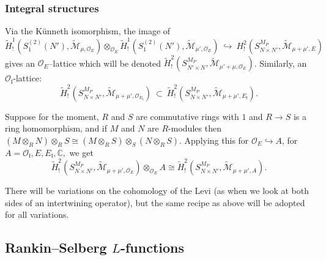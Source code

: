 \documentclass[11pt]{amsart}
\newcommand{\cO}{\mathcal O}
\newcommand{\fl}{\mathfrak l}
\begin{document}
\subsubsection{Integral structures}
\label{sec:integral-kunneth-levi}
Via the K\"unneth isomorphism, the image of 
 $$
 \tilde{H}^1_!(S_1^{(2)}(N'), \widetilde{\mathcal{M}}_{\mu, \mathcal{O}_E}) 
 \otimes_{\mathcal{O}_E} 
 \tilde{H}^1_!(S_1^{(2)}(N'), \widetilde{\mathcal{M}}_{\mu', \mathcal{O}_E}) \ \hookrightarrow \ 
 H^2_{!}(S^{M_P}_{N \times N'}, \widetilde{\mathcal{M}}_{\mu +\mu', E})
 $$ 
gives an $\mathcal{O}_E$--lattice 
which will be denoted $\tilde{H}^2_{!}(S^{M_P}_{N' \times N}, \widetilde{\mathcal{M}}_{\mu' +\mu, \mathcal{O}_E})$.
Similarly, an $\cO_\fl$-lattice: 
$$
\tilde{H}^2_{!}(S^{M_P}_{N \times N'}, \widetilde{\mathcal{M}}_{\mu +\mu', \mathcal{O}_{E_\fl}}) \ \subset \ 
\tilde{H}^2_{!}(S^{M_P}_{N \times N'}, \widetilde{\mathcal{M}}_{\mu +\mu', E_\fl}).
$$




\smallskip

Suppose for the moment, $R$ and $S$ are commutative rings with $1$ and $R \rightarrow S$ is a ring homomorphism, and if $M$ and $N$ are  $R$-modules then
$(M\otimes_R N) \otimes_R S \cong (M\otimes_R S) \otimes_S (N\otimes_R S).$ 
Applying this for $\cO_E \hookrightarrow A$, for $A =\mathcal{O}_\mathfrak{l}, E, E_\mathfrak{l}, \mathbb{C},$ we get
\begin{equation}
	\tilde{H}^2_{!}(S^{M_P}_{N \times N'}, \widetilde{\mathcal{M}}_{\mu +\mu', \mathcal{O}_E})\otimes_{\mathcal{O}_E} A 
	\cong \tilde{H}^2_{!}(S^{M_P}_{N \times N'}, \widetilde{\mathcal{M}}_{\mu +\mu', A}). \label{eqn: functorial-relations-for-the-levi-1}
\end{equation}


\smallskip
There will be variations on the cohomology of the Levi (as when we look at both sides of an intertwining operator), 
but the same recipe as above will be adopted for all variations. 




\medskip
\subsection{Rankin--Selberg $L$-functions}
\end{document}
